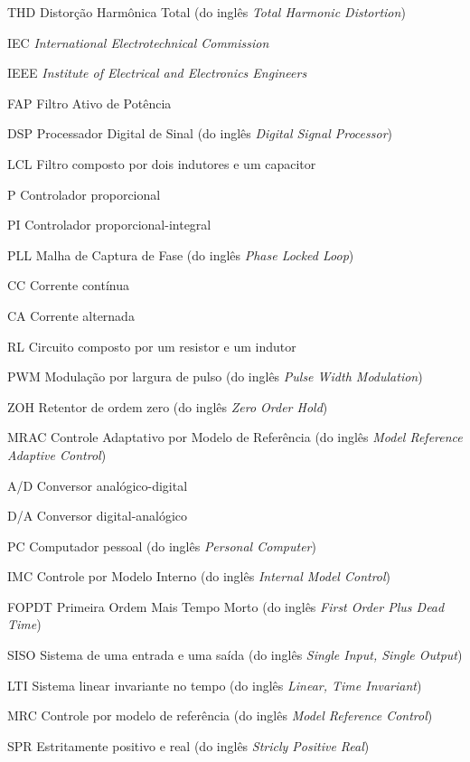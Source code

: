 \documentclass[12pt,
              openright,
              twoside,
              a4paper,
              english,
              french,
              spanish,
              sumario=tradicional,
              brazil
              ]{abntex2}
\begin{document}
\begin{siglas}
 \item[THD]  Distorção Harmônica Total (do inglês \emph{Total Harmonic Distortion})
 \item[IEC]  \emph{International Electrotechnical Commission}
 \item[IEEE] \emph{Institute of Electrical and Electronics Engineers}
 \item[FAP]  Filtro Ativo de Potência
 \item[DSP]  Processador Digital de Sinal (do inglês \emph{Digital Signal Processor})
 \item[LCL]  Filtro composto por dois indutores e um capacitor
 \item[P]    Controlador proporcional
 \item[PI]   Controlador proporcional-integral
 \item[PLL]  Malha de Captura de Fase (do inglês \emph{Phase Locked Loop})
 \item[CC]   Corrente contínua
 \item[CA]   Corrente alternada
 \item[RL]   Circuito composto por um resistor e um indutor
 \item[PWM]  Modulação por largura de pulso (do inglês \emph{Pulse Width Modulation})
 \item[ZOH]  Retentor de ordem zero (do inglês \emph{Zero Order Hold})
 \item[MRAC] Controle Adaptativo por Modelo de Referência (do inglês \emph{Model Reference Adaptive Control})
 \item[A/D]  Conversor analógico-digital
 \item[D/A]  Conversor digital-analógico
 \item[PC]   Computador pessoal (do inglês \emph{Personal Computer})
 \item[IMC]  Controle por Modelo Interno (do inglês \emph{Internal Model Control})
 \item[FOPDT] Primeira Ordem Mais Tempo Morto (do inglês \emph{First Order Plus Dead Time})
 \item[SISO] Sistema de uma entrada e uma saída (do inglês \emph{Single Input, Single Output})
 \item[LTI]  Sistema linear invariante no tempo (do inglês \emph{Linear, Time Invariant})
 \item[MRC]  Controle por modelo de referência (do inglês \emph{Model Reference Control})
 \item[SPR]  Estritamente positivo e real (do inglês \emph{Stricly Positive Real})
\end{siglas}
\end{document}
